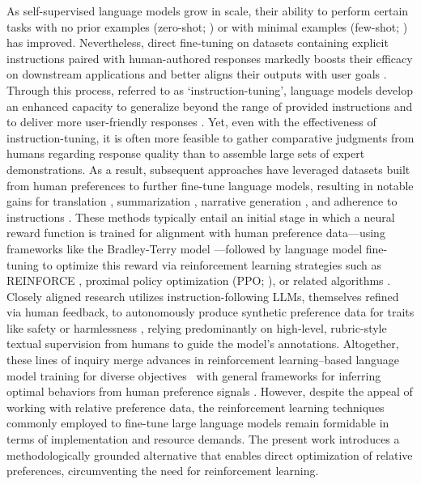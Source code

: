 As self-supervised language models grow in scale, their ability to perform certain tasks with no prior examples (zero-shot; \citep{radford2019language}) or with minimal examples (few-shot; \citep{gpt3,megatron,chowdhery2022palm}) has improved. Nevertheless, direct fine-tuning on datasets containing explicit instructions paired with human-authored responses markedly boosts their efficacy on downstream applications and better aligns their outputs with user goals \citep{mishra-etal-2022-cross,sanh2022multitask,chung2022scaling,thoppilan2022lamda}. Through this process, referred to as `instruction-tuning', language models develop an enhanced capacity to generalize beyond the range of provided instructions and to deliver more user-friendly responses \citep{chung2022scaling}. Yet, even with the effectiveness of instruction-tuning, it is often more feasible to gather comparative judgments from humans regarding response quality than to assemble large sets of expert demonstrations. As a result, subsequent approaches have leveraged datasets built from human preferences to further fine-tune language models, resulting in notable gains for translation \citep{kreutzer-etal-2018-reliability}, summarization \citep{stiennon2022learning,ziegler2020finetuning}, narrative generation \citep{ziegler2020finetuning}, and adherence to instructions \citep{ouyang2022training,ramamurthy2023is}. These methods typically entail an initial stage in which a neural reward function is trained for alignment with human preference data—using frameworks like the Bradley-Terry model \citep{bradley1952rankanalysis}—followed by language model fine-tuning to optimize this reward via reinforcement learning strategies such as REINFORCE \citep{williams1992reinforce}, proximal policy optimization (PPO; \cite{schulman2017proximal}), or related algorithms \citep{ramamurthy2023is}. Closely aligned research utilizes instruction-following LLMs, themselves refined via human feedback, to autonomously produce synthetic preference data for traits like safety or harmlessness \citep{bai2022constitutional}, relying predominantly on high-level, rubric-style textual supervision from humans to guide the model’s annotations. Altogether, these lines of inquiry merge advances in reinforcement learning–based language model training for diverse objectives~\citep{Ranzato2015SequenceLT,paulus2018a,wu2018learning} with general frameworks for inferring optimal behaviors from human preference signals \citep{christiano2017deep,kupcsik2018learning}. However, despite the appeal of working with relative preference data, the reinforcement learning techniques commonly employed to fine-tune large language models remain formidable in terms of implementation and resource demands. The present work introduces a methodologically grounded alternative that enables direct optimization of relative preferences, circumventing the need for reinforcement learning.

